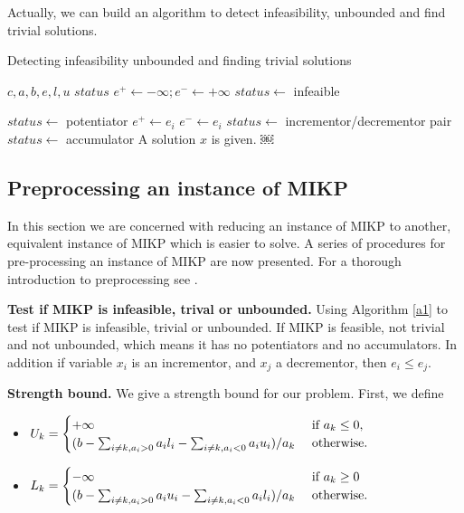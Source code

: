 \documentclass[a4paper,11pt]{article}
\begin{document}
Actually, we can build an algorithm to detect infeasibility, unbounded and find trivial solutions.
\begin{algorithm}
\caption{Detecting infeasibility unbounded and finding trivial solutions}
\label{a1}
\begin{algorithmic}[1] 
\REQUIRE $c,a,b,e,l,u$
\ENSURE $status$
\STATE $e^+ \leftarrow -\infty; e^- \leftarrow +\infty$
			  \STATE $status \leftarrow$ infeaible
		\ENDIF
		
			  \STATE $status \leftarrow$ potentiator
			  \RETURN
			  \STATE $e^+ \leftarrow e_i$
			  \STATE $e^- \leftarrow e_i$
	    \ENDIF
\ENDFOR
{}
		\STATE $status\leftarrow$ incrementor/decrementor pair
		\RETURN
{}
	\STATE $status\leftarrow$ accumulator
	\STATE A solution $x$ is given.
\ENDIF
\RETURN
￼
\end{algorithmic} 
\end{algorithm}

\subsection{Preprocessing an instance of MIKP}

In this section we are concerned with reducing an instance of MIKP to another, equivalent instance of MIKP which is easier to solve. A series of procedures for pre-processing an instance of MIKP are now presented. For a thorough introduction to preprocessing see \cite{savelsbergh1994preprocessing}.

\textbf{Test if MIKP is infeasible, trival or unbounded.}  Using Algorithm \ref{a1} to test if MIKP is infeasible, trivial or unbounded.  If MIKP is feasible, not trivial and not unbounded, which means it has no potentiators and no accumulators. In addition if variable $x_i$ is an incrementor, and $x_j$ a decrementor, then $e_i ≤ e_j$.

\textbf{Strength bound.} We give a strength bound for our problem. First, we define
\begin{itemize}
\item $U_k=\begin{cases}
+\infty & ~\mbox{if}~ a_k\leq 0,\\
(b-\sum_{i\neq k, a_i>0}a_il_i-\sum_{i\neq k, a_i<0}a_iu_i)/ a_k &~\mbox{otherwise.}~
\end{cases}$
\item $L_k=\begin{cases}
-\infty & ~\mbox{if}~ a_k\geq 0\\
(b-\sum_{i\neq k, a_i>0}a_iu_i-\sum_{i\neq k, a_i<0}a_il_i)/ a_k &~\mbox{otherwise.}~
\end{cases}$
\end{itemize}
\end{document}

